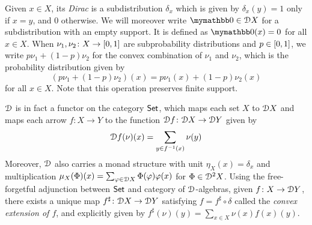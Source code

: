   
 Given $x \in X$, its \emph{Dirac} is a subdistribution $\delta_x$ which is given by $\delta_x(y)=1$ only if $x=y$, and $0$ otherwise. We will moreover write $\emptydist \in \distf X$ for a subdistribution with an empty support. It is defined as $\emptydist(x)=0$ for all $x \in X$. When $\nu_1, \nu_2 \colon X \to \interval{0}{1}$ are subprobability distributions and $p \in \interval{0}{1}$, we write $p\nu_1 + (1-p)\nu_2$ for the convex combination of $\nu_1$ and $\nu_2$, which is the probability distribution given by $$(p \nu_1 + (1-p) \nu_2)(x) = p\nu_1(x) + (1-p)\nu_2(x)$$
 for all $x \in X$. Note that this operation preserves finite support. 
 
  $\mathcal{D}$ is in fact a functor on the category ${\mathsf{Set}}$, which maps each set $X$ to $\mathcal{D} X$ and maps each arrow $f \colon X \to Y$ to the function $\mathcal{D} f \colon \mathcal{D} X \to \mathcal{D} Y$ given by $$\mathcal{D} f (\nu)(x) = \sum_{y \in f^{-1}(x)} \nu(y)$$
   Moreover, $\mathcal{D}$ also  carries a monad structure with unit  $\eta_X(x) = \delta_x$ and multiplication $\mu_X(\Phi)(x) = \sum_{\varphi \in \mathcal{D} X }\Phi(\varphi)\varphi(x)$ for $\Phi \in \mathcal{D}^2 X$. Using the free-forgetful adjunction between ${\mathsf{Set}}$ and category of $\mathcal{D}$-algebras, given $f \colon X \to \mathcal{D} Y$, there exists a unique map $f^\sharp \colon \mathcal{D} X \to \mathcal{D} Y$ satisfying $f = f^\sharp \circ \delta$ called the \emph{convex extension of $f$}, and explicitly given by $f^\sharp(\nu)(y) = \sum_{x \in X} \nu(x) f(x)(y)$.
   
